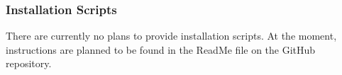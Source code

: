 
\subsubsection{Installation Scripts}
There are currently no plans to provide installation scripts. At the moment, instructions are planned to be found in the ReadMe file on the GitHub repository.




